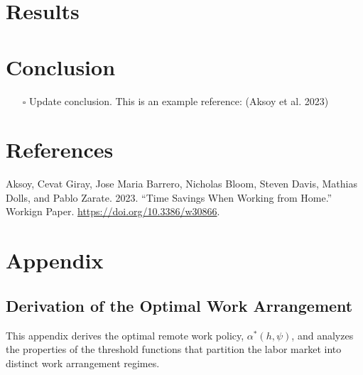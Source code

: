 \documentclass[
  11pt,
  letterpaper,
  DIV=11,
  numbers=noendperiod]{scrartcl}
\providecommand{\tightlist}{%
  \setlength{\itemsep}{0pt}\setlength{\parskip}{0pt}}\usepackage{longtable,booktabs,array}
\newlength{\cslhangindent}
\newenvironment{CSLReferences}[2] %
 {\begin{list}{}{%
  \setlength{\itemindent}{0pt}
  \setlength{\leftmargin}{0pt}
  \setlength{\parsep}{0pt}
  \ifodd #1
   \setlength{\leftmargin}{\cslhangindent}
   \setlength{\itemindent}{-1\cslhangindent}
  \fi
  \setlength{\itemsep}{#2\baselineskip}}}
 {\end{list}}
\begin{document}
\newpage

\section{Results}\label{results}

\section{Conclusion}\label{conclusion}

\begin{itemize}
\tightlist
\item[$\square$]
  Update conclusion. This is an example reference: (Aksoy et al. 2023)
\end{itemize}

\section*{References}\label{references}

\label{refs}
\begin{CSLReferences}{1}{0}
Aksoy, Cevat Giray, Jose Maria Barrero, Nicholas Bloom, Steven Davis,
Mathias Dolls, and Pablo Zarate. 2023. {``Time {Savings When Working}
from {Home}.''} Workign Paper. \url{https://doi.org/10.3386/w30866}.

\end{CSLReferences}

\newpage

\setcounter{section}{0}
\renewcommand{\thesection}{\Alph{section}}

\setcounter{table}{0}
\renewcommand{\thetable}{A\arabic{table}}

\setcounter{figure}{0}
\renewcommand{\thefigure}{A\arabic{figure}}

\section{Appendix}\label{appendix}

\subsection{Derivation of the Optimal Work
Arrangement}\label{sec-appendix-g-cd}

This appendix derives the optimal remote work policy,
\(\alpha^*(h, \psi)\), and analyzes the properties of the threshold
functions that partition the labor market into distinct work arrangement
regimes.
\end{document}
